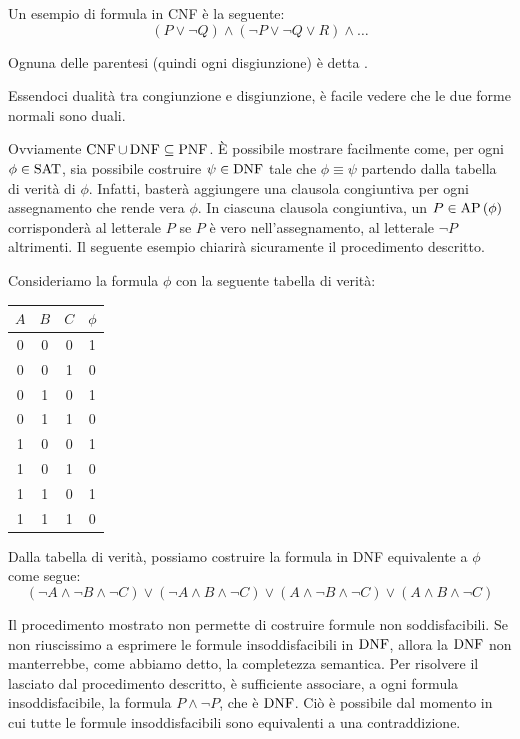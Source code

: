 \begin{example}{}
  Un esempio di formula in CNF è la seguente:
  \[(P\lor \neg Q) \land (\neg P \lor \neg Q \lor R) \land \ldots\]

  Ognuna delle parentesi (quindi ogni disgiunzione) è detta .
\end{example}

Essendoci dualità tra congiunzione e disgiunzione, è facile vedere che le due forme normali sono duali.

Ovviamente \(\operatorname{CNF} \cup \operatorname{DNF} \subseteq \operatorname{PNF}\). È possibile mostrare facilmente come, per ogni \(\phi \in \Sat\), sia possibile costruire \(\psi \in \operatorname{DNF}\) tale che \(\phi \equiv \psi\) partendo dalla tabella di verità di \(\phi\).
Infatti, basterà aggiungere una clausola congiuntiva per ogni assegnamento che rende vera \(\phi\).
In ciascuna clausola congiuntiva, un \(P\in \AP[\phi]\) corrisponderà al letterale \(P\) se \(P\) è vero nell'assegnamento, al letterale \(\neg P\) altrimenti.
Il seguente esempio chiarirà sicuramente il procedimento descritto.

\begin{example}{}
  Consideriamo la formula \(\phi \) con la seguente tabella di verità:

  \begin{center}
    \begin{tabular}{ccc|c}
      \(A\) & \(B\) & \(C\) & \(\phi\)\\
      \hline
      0 & 0 & 0 & 1\\
      0 & 0 & 1 & 0\\
      0 & 1 & 0 & 1\\
      0 & 1 & 1 & 0\\
      1 & 0 & 0 & 1\\
      1 & 0 & 1 & 0\\
      1 & 1 & 0 & 1\\
      1 & 1 & 1 & 0\\
    \end{tabular}
  \end{center}

  Dalla tabella di verità, possiamo costruire la formula in DNF equivalente a \(\phi\) come segue:
  \[(\neg A \land \neg B \land \neg C) \lor (\neg A \land B \land \neg C) \lor (A \land \neg B \land \neg C) \lor (A \land B \land \neg C)\]
  
\end{example}

\begin{note}{}
  Il procedimento mostrato non permette di costruire formule non soddisfacibili. Se non riuscissimo a esprimere le formule insoddisfacibili in \(\operatorname{DNF}\), allora la \(\operatorname{DNF}\) non manterrebbe, come abbiamo detto, la completezza semantica.
  Per risolvere il  lasciato dal procedimento descritto, è sufficiente associare, a ogni formula insoddisfacibile, la formula \(P\land \neg P\), che è \(\operatorname{DNF}\).
  Ciò è possibile dal momento in cui tutte le formule insoddisfacibili sono equivalenti a una contraddizione.
\end{note}

